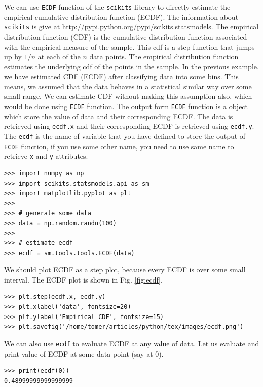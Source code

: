 \documentclass[10pt]{book}
\begin{document}
{We can use \verb"ECDF" function of the \verb"scikits" library to directly estimate the empirical cumulative distribution function (ECDF). The information about \verb"scikits" is give at \url{http://pypi.python.org/pypi/scikits.statsmodels}. The empirical distribution function (CDF) is the cumulative distribution function associated with the empirical measure of the sample. This cdf is a step function that jumps up by $1/n$ at each of the $n$ data points. The empirical distribution function estimates the underlying cdf of the points in the sample. In the previous example, we have estimated CDF (ECDF) after classifying data into some bins. This means, we assumed that the data behaves in a statistical similar way over some small range. We can estimate CDF without making this assumption also, which would be done using \verb"ECDF" function. The output form \verb"ECDF" function is a object which store the value of data and their corresponding ECDF. The data is retrieved using \verb"ecdf.x" and their corresponding ECDF is retrieved using \verb"ecdf.y". The \verb"ecdf" is the name of variable that you have defined to store the output of \verb"ECDF" function, if you use some other name, you need to use same name to retrieve \verb"x" and \verb"y" attributes. 
\beforeverb \begin{verbatim}
>>> import numpy as np
>>> import scikits.statsmodels.api as sm
>>> import matplotlib.pyplot as plt
>>> 
>>> # generate some data
>>> data = np.random.randn(100)
>>> 
>>> # estimate ecdf
>>> ecdf = sm.tools.tools.ECDF(data)
\end{verbatim} \afterverb

We should plot ECDF as a step plot, because every ECDF is over some small interval. The ECDF plot is shown in Fig. \ref{fig:ecdf}. 
\beforeverb \begin{verbatim}
>>> plt.step(ecdf.x, ecdf.y)
>>> plt.xlabel('data', fontsize=20)
>>> plt.ylabel('Empirical CDF', fontsize=15)
>>> plt.savefig('/home/tomer/articles/python/tex/images/ecdf.png')
\end{verbatim} \afterverb

We can also use \verb"ecdf" to evaluate ECDF at any value of data. Let us evaluate and print value of ECDF at some data point (say at 0).
\beforeverb \begin{verbatim}
>>> print(ecdf(0))
0.48999999999999999
\end{verbatim} \afterverb

}
\end{document}
